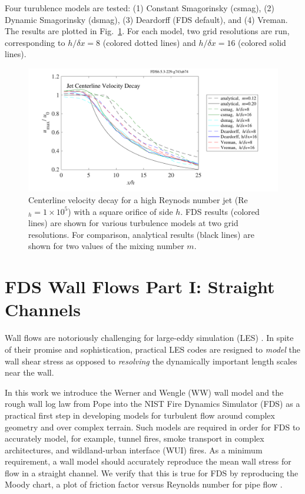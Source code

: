 \documentclass[11pt]{book}
\begin{document}
Four turublence models are tested: (1) Constant Smagorinsky (csmag), (2) Dynamic Smagorinsky (dsmag), (3) Deardorff (FDS default), and (4) Vreman.  The results are plotted in Fig.~\ref{fig_jet_decay}. For each model, two grid resolutions are run, corresponding to $h/\delta x = 8$ (colored dotted lines) and $h/\delta x=16$ (colored solid lines).
\begin{center}
\begin{figure}[h]
  \includegraphics[width=\textwidth]{SCRIPT_FIGURES/jet_decay.pdf}
  \caption[Jet Centerline Velocity Decay]{Centerline velocity decay for a high Reynods number jet (Re$_h = 1 \times 10^5$) with a square orifice of side $h$.  FDS results (colored lines) are shown for various turbulence models at two grid resolutions.  For comparison, analytical results (black lines) are shown for two values of the mixing number $m$.}
  \label{fig_jet_decay}
\end{figure}
\end{center}

\clearpage

\section{FDS Wall Flows Part I: Straight Channels}
\label{fds_wall_flows1}

Wall flows are notoriously challenging for large-eddy simulation (LES) \cite{Baggett:1997,Baggett:1998,Cabot:1995,Pope:2000,Sagaut:2001}.  In spite of their promise and sophistication, practical LES codes are resigned to \emph{model} the wall shear stress as opposed to \emph{resolving} the dynamically important length scales near the wall.

In this work we introduce the Werner and Wengle (WW) wall model \cite{Werner:1991} and the rough wall log law from Pope \cite{Pope:2000} into the NIST Fire Dynamics Simulator (FDS) as a practical first step in developing models for turbulent flow around complex geometry and over complex terrain.  Such models are required in order for FDS to accurately model, for example, tunnel fires, smoke transport in complex architectures, and wildland-urban interface (WUI) fires. As a minimum requirement, a wall model should accurately reproduce the mean wall stress for flow in a straight channel.  We verify that this is true for FDS by reproducing the Moody chart, a plot of friction factor versus Reynolds number for pipe flow \cite{Moody:1944}.
\end{document}
